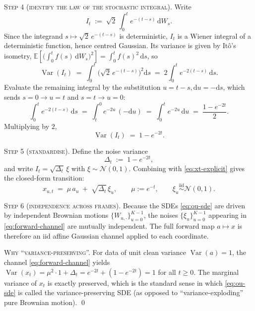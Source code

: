 \documentclass[11pt]{article}
\theoremstyle{definition}
\newcommand{\E}{\mathbb{E}}
\newcommand{\Var}{\operatorname{Var}}
\newcommand{\Detl}{\Delta_t}
\begin{document}
\begin{derivation}
\medskip\noindent
\textsc{Step 4 (identify the law of the stochastic integral).}
Write
\begin{equation}
    I_t \;:=\; \sqrt{2}\, \int_{0}^{t} e^{-(t - s)}\, \mathrm d W_s.
\end{equation}
Since the integrand \(s \mapsto \sqrt{2}\, e^{-(t - s)}\) is deterministic,
\(I_t\) is a Wiener integral of a deterministic function, hence centred
Gaussian. Its variance is given by It\^o's isometry,
\(\E\!\left[\bigl(\int_0^t f(s)\, \mathrm d W_s\bigr)^{2}\right] = \int_0^t
f(s)^2\, \mathrm d s\), so
\begin{equation}
    \Var(I_t)
    \;=\; \int_{0}^{t} \bigl(\sqrt{2}\, e^{-(t - s)}\bigr)^2 \mathrm d s
    \;=\; 2 \int_{0}^{t} e^{-2 (t - s)}\, \mathrm d s.
\end{equation}
Evaluate the remaining integral by the substitution
\(u = t - s, \mathrm d u = -\mathrm d s\), which sends
\(s = 0 \to u = t\) and \(s = t \to u = 0\):
\begin{equation}
    \int_{0}^{t} e^{-2 (t - s)}\, \mathrm d s
    \;=\; \int_{t}^{0} e^{-2 u}\, (-\mathrm d u)
    \;=\; \int_{0}^{t} e^{-2 u}\, \mathrm d u
    \;=\; \frac{1 - e^{-2 t}}{2}.
\end{equation}
Multiplying by \(2\),
\begin{equation}
    \Var(I_t) \;=\; 1 - e^{-2 t}.
\end{equation}

\medskip\noindent
\textsc{Step 5 (standardise).}
Define the noise variance
\begin{equation}
    \Detl \;:=\; 1 - e^{-2 t},
\end{equation}
and write \(I_t = \sqrt{\Detl}\, \xi\) with \(\xi \sim \mathcal N(0, 1)\).
Combining with \eqref{eq:xt-explicit} gives the closed-form transition:
\begin{equation}\label{eq:forward-channel}
    \boxed{\;\;
    x_{u, t} \;=\; \mu\, a_u \;+\; \sqrt{\Detl}\, \xi_u,
    \qquad
    \mu := e^{-t},
    \qquad
    \xi_u \stackrel{\text{iid}}{\sim} \mathcal N(0, 1).
    \;\;}
\end{equation}

\medskip\noindent
\textsc{Step 6 (independence across frames).}
Because the SDEs \eqref{eq:ou-sde} are driven by independent Brownian
motions \(\{W_{u, \cdot}\}_{u = 0}^{K - 1}\), the noises
\(\{\xi_u\}_{u = 0}^{K - 1}\) appearing in \eqref{eq:forward-channel} are
mutually independent. The full forward map \(a \mapsto x\) is therefore an
iid affine Gaussian channel applied to each coordinate.

\medskip\noindent
\textsc{Why ``variance-preserving''.}
For data of unit clean variance \(\Var(a) = 1\), the channel
\eqref{eq:forward-channel} yields
\(\Var(x_t) = \mu^2 \cdot 1 + \Detl = e^{-2 t} + (1 - e^{-2 t}) = 1\) for
all \(t \geq 0\). The marginal variance of \(x_t\) is exactly preserved,
which is the standard sense in which \eqref{eq:ou-sde} is called the
variance-preserving SDE (as opposed to ``variance-exploding'' pure
Brownian motion). \qed
\end{derivation}
\end{document}
